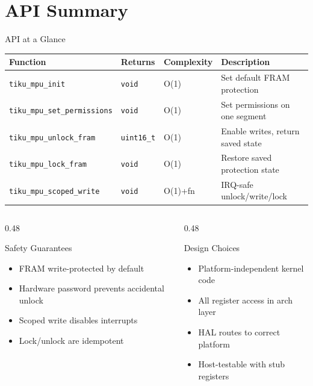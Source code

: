 \documentclass[aspectratio=169, 10pt]{beamer}
\begin{document}
\section{API Summary}

\begin{frame}{API at a Glance}
\begin{table}
\centering
\small
\begin{tabular}{@{}llll@{}}
\toprule
\textbf{Function} & \textbf{Returns} & \textbf{Complexity} & \textbf{Description} \\
\midrule
\texttt{tiku\_mpu\_init}       & \texttt{void}     & O(1) & Set default FRAM protection \\
\texttt{tiku\_mpu\_set\_permissions} & \texttt{void} & O(1) & Set permissions on one segment \\
\texttt{tiku\_mpu\_unlock\_fram}   & \texttt{uint16\_t} & O(1) & Enable writes, return saved state \\
\texttt{tiku\_mpu\_lock\_fram}    & \texttt{void}     & O(1) & Restore saved protection state \\
\texttt{tiku\_mpu\_scoped\_write} & \texttt{void}     & O(1)+fn & IRQ-safe unlock/write/lock \\
\bottomrule
\end{tabular}
\end{table}

\vspace{0.5em}
\begin{columns}[T]
\begin{column}{0.48\textwidth}
\begin{block}{Safety Guarantees}
\begin{itemize}
  \item FRAM write-protected by default
  \item Hardware password prevents accidental unlock
  \item Scoped write disables interrupts
  \item Lock/unlock are idempotent
\end{itemize}
\end{block}
\end{column}
\begin{column}{0.48\textwidth}
\begin{block}{Design Choices}
\begin{itemize}
  \item Platform-independent kernel code
  \item All register access in arch layer
  \item HAL routes to correct platform
  \item Host-testable with stub registers
\end{itemize}
\end{block}
\end{column}
\end{columns}
\end{frame}
\end{document}
